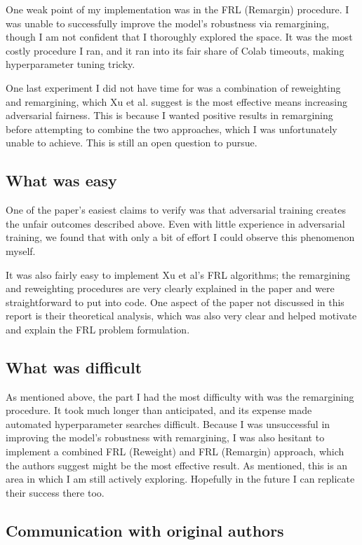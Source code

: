 One weak point of my implementation was in the FRL (Remargin) procedure. I was unable to successfully improve the model's robustness via remargining, though I am not confident that I thoroughly explored the space. It was the most costly procedure I ran, and it ran into its fair share of Colab timeouts, making hyperparameter tuning tricky. 

One last experiment I did not have time for was a combination of reweighting and remargining, which Xu et al. suggest is the most effective means increasing adversarial fairness. This is because I wanted positive results in remargining before attempting to combine the two approaches, which I was unfortunately unable to achieve. This is still an open question to pursue. 

\subsection{What was easy}
One of the paper's easiest claims to verify was that adversarial training creates the unfair outcomes described above. Even with little experience in adversarial training, we found that with only a bit of effort I could observe this phenomenon myself. 

It was also fairly easy to implement Xu et al's FRL algorithms; the remargining and reweighting procedures are very clearly explained in the paper and were straightforward to put into code. One aspect of the paper not discussed in this report is their theoretical analysis, which was also very clear and helped motivate and explain the FRL problem formulation.  

\subsection{What was difficult}
As mentioned above, the part I had the most difficulty with was the remargining procedure. It took much longer than anticipated, and its expense made automated hyperparameter searches difficult. Because I was unsuccessful in improving the model's robustness with remargining, I was also hesitant to implement a combined FRL (Reweight) and FRL (Remargin) approach, which the authors suggest might be the most effective result. As mentioned, this is an area in which I am still actively exploring. Hopefully in the future I can replicate their success there too. 

\subsection{Communication with original authors}

